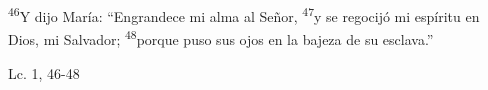 \documentclass[../../rosario.tex]{subfiles}
\begin{document}
    \textsuperscript{46}Y dijo María: ``Engrandece mi alma al Señor, \textsuperscript{47}y se regocijó mi espíritu en Dios, mi Salvador;
    \textsuperscript{48}porque puso sus ojos en la bajeza de su esclava.''
    \begin{flushright}
    Lc. 1, 46-48        
    \end{flushright}
\end{document}
